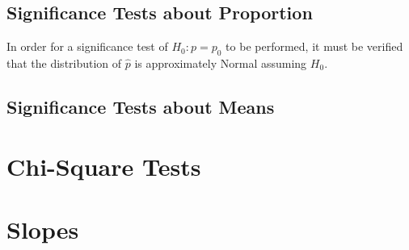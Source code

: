 \documentclass[../AP_Statistics.tex]{subfiles}
\begin{document}
		\section{Significance Tests about Proportion}
			In order for a significance test of $H_0:p = p_0$ to be performed, it must be verified that the distribution of $\hat{p}$ is approximately Normal assuming $H_0$.
			$$$$
		\section{Significance Tests about Means}
		\chapter{Chi-Square Tests}
	\chapter{Slopes}
\end{document}
